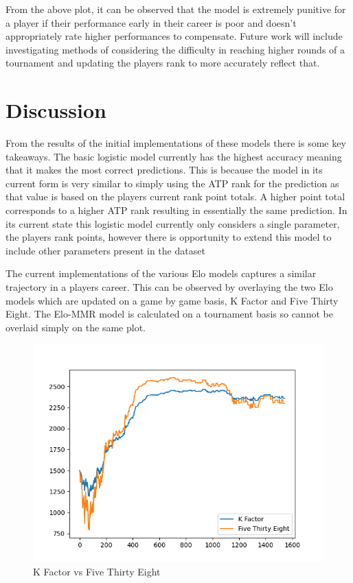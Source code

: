 \documentclass[12pt,a4paper]{article}
\begin{document}
From the above plot, it can be observed that the model is extremely punitive for a player
if their performance early in their career is poor and doesn't appropriately rate higher
performances to compensate. Future work will include investigating methods of considering
the difficulty in reaching higher rounds of a tournament and updating the players rank to
more accurately reflect that.

\vspace{10mm}
\noindent \hrulefill

\clearpage
\section{Discussion}
From the results of the initial implementations of these models there is some key
takeaways. The basic logistic model currently has the highest accuracy meaning that it
makes the most correct predictions. This is because the model in its current form is very
similar to simply using the ATP rank for the prediction as that value is based on the players
current rank point totals. A higher point total corresponds to a higher ATP rank resulting
in essentially the same prediction. In its current state this logistic model currently only
considers a single parameter, the players rank points, however there is opportunity to
extend this model to include other parameters present in the dataset

The current implementations of the various Elo models captures a similar trajectory in a
players career. This can be observed by overlaying the two Elo models which are updated
on a game by game basis, K Factor and Five Thirty Eight. The Elo-MMR model is calculated
on a tournament basis so cannot be overlaid simply on the same plot.
\begin{figure}[H]
  \includegraphics[scale=0.8]{images/federer_comparison.png}
  \caption{K Factor vs Five Thirty Eight}
  \label{fig:federer-k-538}
\end{figure}
\end{document}
